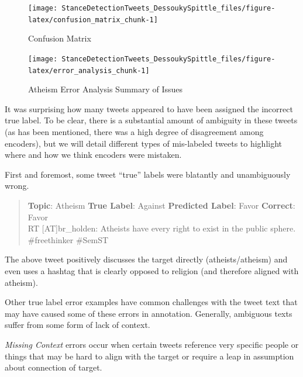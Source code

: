 \documentclass[]{article}
\begin{document}
\begin{figure}

{\centering \texttt{[image: StanceDetectionTweets\_DessoukySpittle\_files/figure-latex/confusion\_matrix\_chunk-1]} 

}

\caption{\label{fig:confusion_matrix}Confusion Matrix}\label{fig:confusion_matrix_chunk}
\end{figure}

\begin{figure}

{\centering \texttt{[image: StanceDetectionTweets\_DessoukySpittle\_files/figure-latex/error\_analysis\_chunk-1]} 

}

\caption{\label{fig:error_analysis}Atheism Error Analysis Summary of Issues}\label{fig:error_analysis_chunk}
\end{figure}

It was surprising how many tweets appeared to have been assigned the
incorrect true label. To be clear, there is a substantial amount of
ambiguity in these tweets (as has been mentioned, there was a high
degree of disagreement among encoders), but we will detail different
types of mis-labeled tweets to highlight where and how we think encoders
were mistaken.

First and foremost, some tweet ``true'' labels were blatantly and
unambiguously wrong.

\begin{quote}
\textbf{Topic}: Atheism \textbar{} \textbf{True Label}: Against
\textbar{} \textbf{Predicted Label}: Favor \textbar{} \textbf{Correct}:
Favor\\
RT {[}AT{]}br\_holden: Atheists have every right to exist in the public
sphere. \#freethinker \#SemST
\end{quote}

The above tweet positively discusses the target directly
(atheists/atheism) and even uses a hashtag that is clearly opposed to
religion (and therefore aligned with atheism).

Other true label error examples have common challenges with the tweet
text that may have caused some of these errors in annotation. Generally,
ambiguous texts suffer from some form of lack of context.

\emph{Missing Context} errors occur when certain tweets reference very
specific people or things that may be hard to align with the target or
require a leap in assumption about connection of target.
\end{document}
